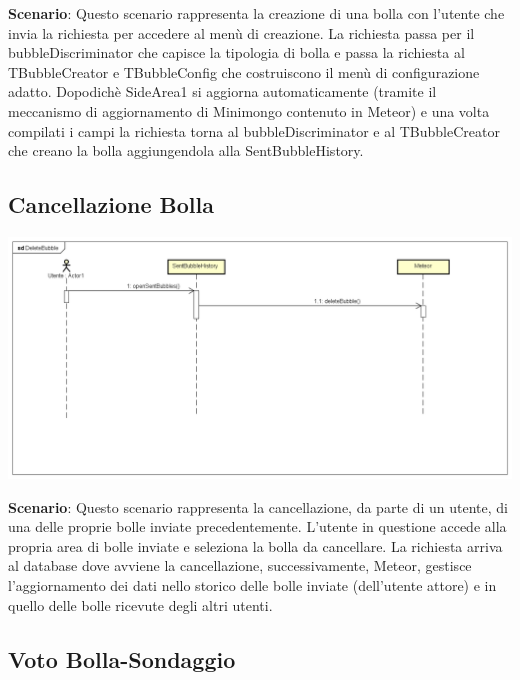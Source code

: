 \newpage

\textbf{Scenario}: 
Questo scenario rappresenta la creazione di una bolla con l’utente che
invia la richiesta per 	accedere al menù di creazione. La richiesta
passa per il bubbleDiscriminator che capisce la 	tipologia di bolla
e passa la richiesta al TBubbleCreator e TBubbleConfig che
costruiscono il 	menù di configurazione adatto.  
Dopodichè SideArea1 si aggiorna automaticamente (tramite il meccanismo di aggiornamento di Minimongo contenuto in Meteor) e
una volta compilati i campi la richiesta torna al bubbleDiscriminator e al TBubbleCreator che 	creano la bolla aggiungendola alla SentBubbleHistory. \\

\subsection{Cancellazione Bolla}

\begin{center}
	\includegraphics[scale=0.36]{img/DeleteBubble.png}
\end{center}



\textbf{Scenario}: 
Questo scenario rappresenta la cancellazione, da parte di un utente, di una delle proprie bolle 	inviate precedentemente. L’utente in questione accede alla propria area di bolle inviate e 	seleziona la bolla da cancellare. La richiesta arriva al database dove avviene la cancellazione, 	successivamente, Meteor, gestisce l’aggiornamento dei dati nello storico delle bolle inviate 	(dell’utente attore) e in quello delle bolle ricevute degli altri utenti. 
\newpage

\subsection{Voto Bolla-Sondaggio}

